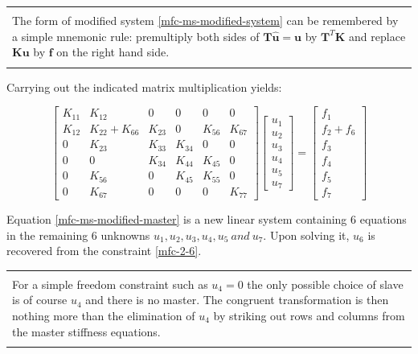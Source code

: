 \documentclass[10pt,b5paper,titlepage]{book}
\newenvironment{bbox}[1][0.96]
{
    \begin{center}
        \begin{tabular}{|p{#1\textwidth}|}
            \hline\\
}
{
            \\\\\hline
        \end{tabular}
    \end{center}
}
\begin{document}
\begin{bbox}
    The form of modified system \eqref{mfc-ms-modified-system} can be remembered
    by a simple mnemonic rule: premultiply both sides of $
    \mathbf{T} \mathbf{\hat{u}} = \mathbf{u} $
    by $ \mathbf{T}^T \mathbf{K} $ and replace $ \mathbf{K} \mathbf{u} $ by
    $ \mathbf{f} $ on the right hand side.
\end{bbox}

Carrying out the indicated matrix multiplication yields:

\begin{equation}\label{mfc-ms-modified-master}
    \begin{bmatrix}
        K_{11} & K_{12} & 0 & 0 & 0 & 0 \\
        K_{12} & K_{22} + K_{66} & K_{23} & 0 & K_{56} & K_{67} \\
        0 & K_{23} & K_{33} & K_{34} & 0 & 0 \\
        0 & 0 & K_{34} & K_{44} & K_{45} & 0 \\
        0 & K_{56} & 0 & K_{45} & K_{55} & 0 \\
        0 & K_{67} & 0 & 0 & 0 & K_{77}
    \end{bmatrix}
    \begin{bmatrix}
        u_1 \\
        u_2 \\
        u_3 \\
        u_4 \\
        u_5 \\
        u_7
    \end{bmatrix}
    = \begin{bmatrix}
        f_1 \\
        f_2 + f_6 \\
        f_3 \\
        f_4 \\
        f_5 \\
        f_7
    \end{bmatrix}
\end{equation}

Equation \eqref{mfc-ms-modified-master} is a new linear system containing 6 equations
in the remaining 6 unknowns $ u_1, u_2, u_3, u_4, u_5\ and\ u_7 $. Upon
solving it, $ u_6 $ is recovered from the constraint \eqref{mfc-2-6}.

\begin{bbox}
    For a simple freedom constraint such as $ u_4 = 0 $ the only possible choice of slave
    is of course $ u_4 $ and there is no master. The congruent transformation is then
    nothing more than the elimination of $ u_4 $ by striking out rows and columns from
    the master stiffness equations.
\end{bbox}
\end{document}
